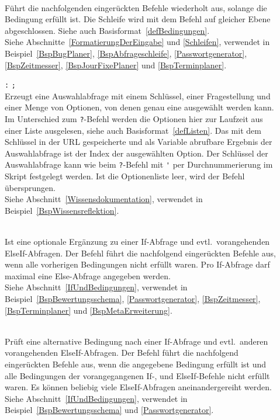 \begin{description}
\item[] \\
Führt die nachfolgenden eingerückten Befehle wiederholt aus, solange die Bedingung erfüllt ist. Die Schleife wird mit dem Befehl  auf gleicher Ebene abgeschlossen. Siehe auch Basisformat~\ref{defBedingungen}.\\
Siehe Abschnitte~\ref{FormatierungDerEingabe} und \ref{Schleifen}, verwendet in Beispiel~\ref{BspBugPlaner}, \ref{BspAbfrageschleife}, \ref{Passwortgenerator}, \ref{BspZeitmesser}, \ref{BspJourFixePlaner} und \ref{BspTerminplaner}.

\item[]  \verb|:|  \verb|;| \\
Erzeugt eine Auswahlabfrage mit einem Schlüssel, einer Fragestellung und einer Menge von Optionen, von denen genau eine ausgewählt werden kann. Im Unterschied zum \verb|?|-Befehl werden die Optionen hier zur Laufzeit aus einer Liste ausgelesen, siehe auch Basisformat~\ref{defListen}.
Das mit dem Schlüssel in der URL gespeicherte und als Variable abrufbare Ergebnis der Auswahlabfrage ist der Index der ausgewählten Option.
Der Schlüssel der Auswahlabfrage kann wie beim \verb|?|-Befehl mit \verb|'| per Durchnummerierung im Skript festgelegt werden.
Ist die Optionenliste leer, wird der Befehl übersprungen.\\
Siehe Abschnitt~\ref{Wissensdokumentation}, verwendet in Beispiel~\ref{BspWissensreflektion}.

\item[]\mbox{}\\
Ist eine optionale Ergänzung zu einer If-Abfrage und evtl.\ vorangehenden ElseIf-Abfragen. Der Befehl führt die nachfolgend eingerückten Befehle aus, wenn alle vorherigen Bedingungen nicht erfüllt waren. Pro If-Abfrage darf maximal eine Else-Abfrage angegeben werden.\\
Siehe Abschnitt~\ref{IfUndBedingungen}, verwendet in Beispiel~\ref{BspBewertungsschema}, \ref{Passwortgenerator}, \ref{BspZeitmesser}, \ref{BspTerminplaner} und \ref{BspMetaErweiterung}.

\item[] \\
Prüft eine alternative Bedingung nach einer If-Abfrage und evtl.\ anderen vorangehenden ElseIf-Abfragen. Der Befehl führt die nachfolgend eingerückten Befehle aus, wenn die angegebene Bedingung erfüllt ist und alle Bedingungen der vorangegangenen If-, und ElseIf-Befehle nicht erfüllt waren. Es können beliebig viele ElseIf-Abfragen aneinandergereiht werden.\\
Siehe Abschnitt~\ref{IfUndBedingungen}, verwendet in Beispiel~\ref{BspBewertungsschema} und \ref{Passwortgenerator}.


\end{description}
